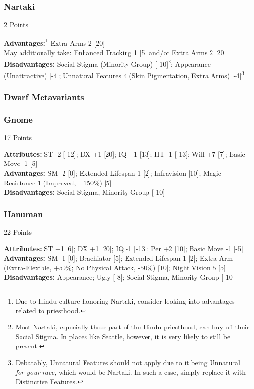\begin{multicols*}{3}
	\subsubsection*{Nartaki}
	\begin{flushright}
		2 Points
	\end{flushright}
	\textbf{Advantages:}\footnote{Due to Hindu culture honoring Nartaki, consider looking into advantages related to priesthood.} 
	Extra Arms 2 [20]
	\\May additionally take: Enhanced Tracking 1 [5] and/or Extra Arms 2 [20]
	\\\textbf{Disadvantages:} 
	Social Stigma (Minority Group) [-10]\footnote{Most Nartaki, especially those part of the Hindu priesthood, can buy off their Social Stigma. In places like Seattle, however, it is very likely to still be present.}; Appearance (Unattractive) [-4]; Unnatural Features 4 (Skin Pigmentation, Extra Arms) [-4]\footnote{Debatably, Unnatural Features should not apply due to it being Unnatural \textit{for your race,} which would be Nartaki. In such a case, simply replace it with Distinctive Features.}
	
	\subsubsection{Dwarf Metavariants}
	
	\subsubsection*{Gnome}
	\begin{flushright}
		17 Points
	\end{flushright}
	\textbf{Attributes:}
	ST -2 [-12]; DX +1 [20]; IQ +1 [13]; HT -1 [-13]; Will +7 [7]; Basic Move -1 [5]
	\\\textbf{Advantages:}
	SM -2 [0]; Extended Lifespan 1 [2]; Infravision [10]; Magic Resistance 1 (Improved, +150\%) [5]
	\\\textbf{Disadvantages:} 
	Social Stigma, Minority Group [-10]
	
	\subsubsection*{Hanuman}
	\begin{flushright}
		22 Points
	\end{flushright}
	\textbf{Attributes:}
	ST +1 [6]; DX +1 [20]; IQ -1 [-13]; Per +2 [10]; Basic Move -1 [-5]
	\\\textbf{Advantages:}
	SM -1 [0]; Brachiator [5]; Extended Lifespan 1 [2]; Extra Arm (Extra-Flexible, +50\%; No Physical Attack, -50\%) [10]; Night Vision 5 [5]
	\\\textbf{Disadvantages:} 
	Appearance; Ugly [-8]; Social Stigma, Minority Group [-10]
	

\end{multicols*}
